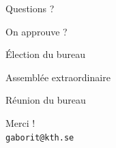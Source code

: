 \documentclass[10pt]{beamer}
\begin{document}
\begin{frame}[standout]
	Questions ?
\end{frame}

\begin{frame}[standout]
	On approuve ?
\end{frame}

\begin{frame}[standout]
	Élection du bureau
\end{frame}

\begin{frame}[standout]
	Assemblée extraordinaire
\end{frame}

\begin{frame}[standout]
	Réunion du bureau
\end{frame}

\begin{frame}[standout] %
	\vspace{0.05\textwidth}
	Merci !\\
	\vspace{0.25\textwidth}
	\small{\texttt{gaborit@kth.se}}\\
\end{frame}
\end{document}
